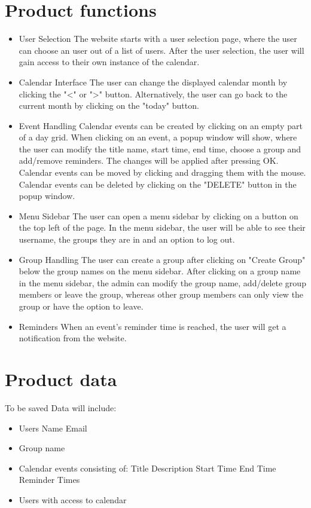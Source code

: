 \documentclass[]{article}
\begin{document}
\section{Product functions}
	\begin{itemize}
		\item User Selection
			\subitem The website starts with a user selection page, where the user can choose an user out of a list of users.
			\subitem After the user selection, the user will gain access to their own instance of the calendar.
		\item Calendar Interface
			\subitem The user can change the displayed calendar month by clicking the "\textless" or "\textgreater" button.
			\subitem Alternatively, the user can go back to the current month by clicking on the "today" button.
		\item Event Handling
			\subitem Calendar events can be created by clicking on an empty part of a day grid.
			\subitem When clicking on an event, a popup window will show, where the user can modify the title name, start time, end time, choose a group and add/remove reminders. The changes will be applied after pressing OK.
			\subitem Calendar events can be moved by clicking and dragging them with the mouse.
			\subitem Calendar events can be deleted by clicking on the "DELETE" button in the popup window.
		\item Menu Sidebar
			\subitem The user can open a menu sidebar by clicking on a button on the top left of the page.
			\subitem In the menu sidebar, the user will be able to see their username, the groups they are in and an option to log out.
		\item Group Handling
			\subitem The user can create a group after clicking on "Create Group" below the group names on the menu sidebar.
			\subitem After clicking on a group name in the menu sidebar, the admin can modify the group name, add/delete group members or leave the group, whereas other group members can only view the group or have the option to leave.
		\item Reminders
			\subitem When an event's reminder time is reached, the user will get a notification from the website.
	\end{itemize}
\section{Product data}
	To be saved Data will include:
	\begin{itemize}
		\item Users
			\subitem Name
			\subitem Email
		\item Group name
		\item Calendar events consisting of:
			\subitem Title
			\subitem Description
			\subitem Start Time
			\subitem End Time
			\subitem Reminder Times
		\item Users with access to calendar
	\end{itemize}
\end{document}

